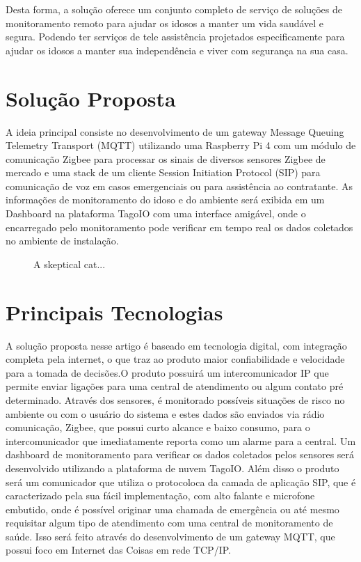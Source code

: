 \documentclass{acm_proc_article-sp}
\newcommand{\fig}[4][htb]{
  \begin{figure}[#1]
    {\centering{\texttt{[image: fig/\#2]}}\par}
    \caption{#3}
    \label{fig:#2}
  \end{figure}
}
\begin{document}
Desta forma, a solução oferece um conjunto completo de serviço de soluções de monitoramento remoto para ajudar os idosos a manter um vida saudável e segura. Podendo ter serviços de tele assistência projetados especificamente para ajudar os idosos a manter sua independência e viver com segurança na sua casa.

\section{Solução Proposta}

A ideia principal consiste
no desenvolvimento de um gateway Message Queuing Telemetry Transport (MQTT)
utilizando uma Raspberry Pi 4 com um módulo de comunicação Zigbee para processar os
sinais de diversos sensores Zigbee de mercado e uma stack de um cliente Session Initiation
Protocol (SIP) para comunicação de voz em casos emergenciais ou para assistência ao
contratante. As informações de monitoramento do idoso e do ambiente será exibida em um
Dashboard na plataforma TagoIO com uma interface amigável, onde o encarregado pelo
monitoramento pode verificar em tempo real os dados coletados no ambiente de instalação.

\fig{cat}{A skeptical cat...}{width=0.8\columnwidth}

\section{Principais Tecnologias}

A solução proposta nesse artigo é baseado em tecnologia digital, com integração
completa pela internet, o que traz ao produto maior confiabilidade e velocidade para
a tomada de decisões.O produto possuirá um intercomunicador
IP que permite enviar ligações para uma central de atendimento ou algum contato pré
determinado. Através dos sensores, é monitorado possíveis situações de risco no ambiente
ou com o usuário do sistema e estes dados são enviados via rádio comunicação, Zigbee, que possui curto alcance e baixo consumo, para o intercomunicador que imediatamente reporta como um alarme para a central. Um dashboard de
monitoramento para verificar os dados coletados pelos sensores será desenvolvido utilizando
a plataforma de nuvem TagoIO.
Além disso o produto será um comunicador que utiliza o protocoloca da camada de aplicação SIP, que é caracterizado pela sua fácil implementação, com alto falante e
microfone embutido, onde é possível originar uma chamada de emergência ou até mesmo
requisitar algum tipo de atendimento com uma central de monitoramento de saúde. Isso será feito através do desenvolvimento de um gateway MQTT, que possui foco em Internet das Coisas em rede TCP/IP.
\end{document}

